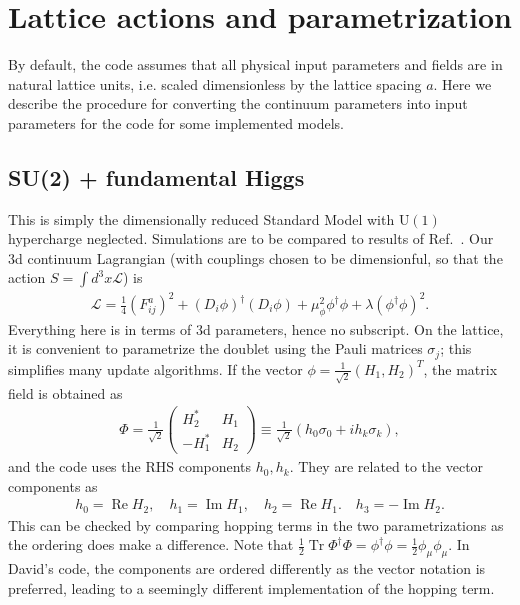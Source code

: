 \documentclass[11pt,a4paper]{article}
\newcommand\RE{\operatorname{Re}}
\newcommand\IM{\operatorname{Im}}
\newcommand\Tr{\operatorname{Tr}}
\newcommand\he[1]{#1^\dagger}%
\newcommand\gr[1]{\mathrm{#1}}%
\newcommand\lauri[1]{{\color{myorange}#1}}
\begin{document}
\section{Lattice actions and parametrization}


By default, the code assumes that all physical input parameters and fields are in natural lattice units, i.e. scaled dimensionless by the lattice spacing $a$. Here we describe the procedure for converting the continuum parameters into input parameters for the code for some implemented models. 


\subsection{SU(2) + fundamental Higgs}


This is simply the dimensionally reduced Standard Model with $\gr{U(1)}$ hypercharge neglected. Simulations are to be compared to results of Ref.~\cite{Kajantie:1995kf}. Our 3d continuum Lagrangian (with couplings chosen to be dimensionful, so that the action $S = \int d^3x \mathcal{L}$) is 
\begin{align}
\mathcal{L} = \frac14 (F^a_{ij})^2 + (D_i \phi)^\dagger (D_i \phi) + \mu^2_\phi \phi^\dagger\phi + \lambda (\phi^\dagger\phi)^2.
\end{align}
Everything here is in terms of 3d parameters, hence no subscript. On the lattice, it is convenient to parametrize the doublet using the Pauli matrices $\sigma_j$; this simplifies many update algorithms. If the vector $\phi = \frac{1}{\sqrt{2}}(H_1, H_2)^T$, the matrix field is obtained as 
\begin{align}
\label{eq:Higgs-matrix}
\Phi = \frac{1}{\sqrt{2}}\begin{pmatrix}
H_2^* & H_1 \\
-H_1^* & H_2
\end{pmatrix} \equiv \frac{1}{\sqrt{2}} (h_0 \sigma_0 + i h_k \sigma_k), 
\end{align}
and the code uses the RHS components $h_0, h_k$. They are related to the vector components as 
\begin{align}
h_0 = \RE H_2, \quad h_1 = \IM H_1, \quad h_2 = \RE H_1. \quad h_3 = -\IM H_2.
\end{align}
This can be checked by comparing hopping terms in the two parametrizations as the ordering does make a difference. Note that $\frac12 \Tr \he\Phi\Phi = \he\phi\phi = \frac12 \phi_\mu \phi_\mu$. \lauri{In David's code, the components are ordered differently as the vector notation is preferred, leading to a seemingly different implementation of the hopping term.}
\end{document}
